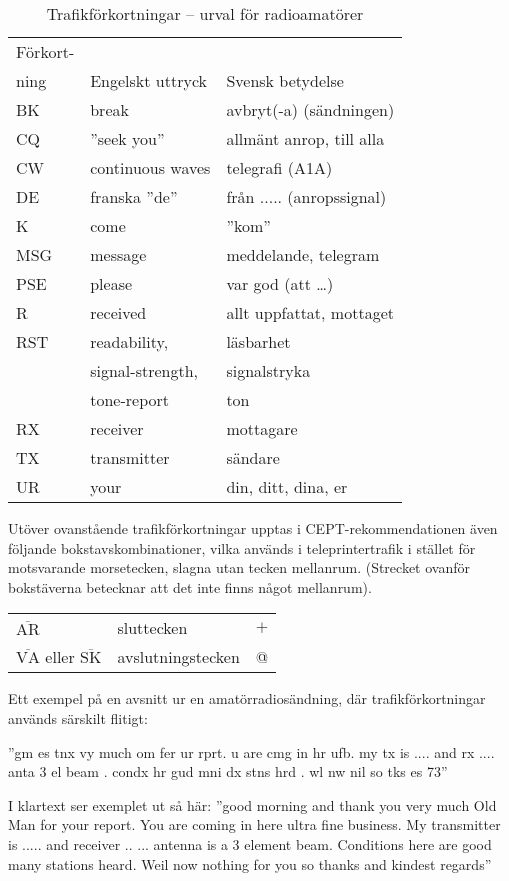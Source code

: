 \begin{table}
  \label{tab:trafikförkortningar}
  \caption{Trafikförkortningar -- urval för radioamatörer}
  \begin{tabular}{lll}
    Förkort- & & \\
    ning & Engelskt uttryck & Svensk betydelse \\
    \hline
    BK & break & avbryt(-a) (sändningen) \\
    CQ & ''seek you'' & allmänt anrop, till alla \\
    CW & continuous waves & telegrafi (A1A) \\
    DE & franska ''de'' & från ..... (anropssignal) \\
    K  & come & ''kom'' \\
    MSG & message & meddelande, telegram \\
    PSE & please & var god (att \dots) \\
    R & received & allt uppfattat, mottaget \\
   RST & readability, & läsbarhet \\
   & signal-strength, & signalstryka \\
   & tone-report & ton \\
    RX & receiver & mottagare \\
    TX & transmitter & sändare \\
    UR & your & din, ditt, dina, er \\
  \end{tabular}
\end{table}

Utöver ovanstående trafikförkortningar upptas i CEPT-rekommendationen
även följande bokstavskombinationer, vilka används i teleprintertrafik
i stället för motsvarande morsetecken, slagna utan tecken mellanrum.
(Strecket ovanför bokstäverna betecknar att det inte finns något
mellanrum).

\begin{tabular}{lll}
  \(\overline{\mathrm{AR}}\) & sluttecken & \(+\) \\
  \(\overline{\mathrm{VA}}\) eller \(\overline{\mathrm{SK}}\) & avslutningstecken & @ \\
\end{tabular}

Ett exempel på en avsnitt ur en amatörradiosändning, där
trafikförkortningar används särskilt flitigt:

''gm es tnx vy much om fer ur rprt. u are cmg in hr ufb. my tx is
.... and rx .... anta 3 el beam . condx hr gud mni dx stns hrd . wl nw
nil so tks es 73''

I klartext ser exemplet ut så här: ''good morning and thank you very
much Old Man for your report. You are coming in here ultra fine
business. My transmitter is .....  and receiver .. ... antenna is a 3
element beam. Conditions here are good many stations heard. Weil now
nothing for you so thanks and kindest regards''
